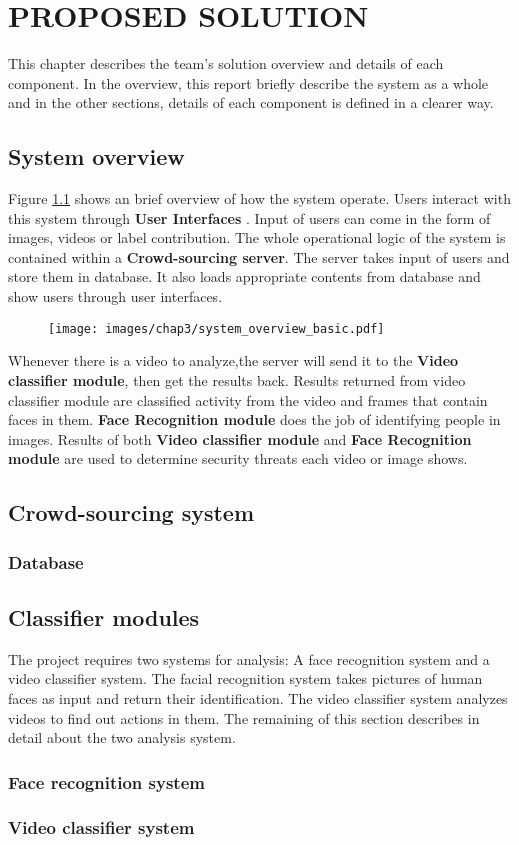 \chapter{PROPOSED SOLUTION}
\label{chap:solution}

This chapter describes the team's solution overview and details of each component. In the overview, this report briefly describe the system as a whole and in the other sections, details of each component is defined in a clearer way.
\section{System overview}

Figure \ref{chap3:system_overview_basic} shows an brief overview of how the system operate. Users interact with this system through \textbf{User Interfaces}
. Input of users can come in the form of images, videos or label contribution. The whole operational logic of the  system is contained within a \textbf{Crowd-sourcing server}. The server takes input of users and store them in database. It also loads appropriate contents from database and show users through user interfaces. 
\begin{center}
    \begin{figure}[H]
    \centering
    \texttt{[image: images/chap3/system\_overview\_basic.pdf]}
    \label{chap3:system_overview_basic}
    \end{figure}
\end{center}
Whenever there is a video to analyze,the server will send it to the \textbf{Video classifier module}, then get the results back. Results returned from video classifier module are classified activity from the video and frames that contain faces in them. \textbf{Face Recognition module} does the job of identifying people in images. Results of both \textbf{Video classifier module} and \textbf{Face Recognition module} are used to determine security threats each video or image shows.

\section{Crowd-sourcing system}
\subsection{Database}
\section{Classifier modules}
The project requires two systems for analysis: A face recognition system and a video classifier system. The facial recognition system takes pictures of human faces as input and return their identification. The video classifier system analyzes videos to find out actions in them. The remaining of this section describes in detail about the two analysis system.
\subsection{Face recognition system}

\subsection{Video classifier system}
